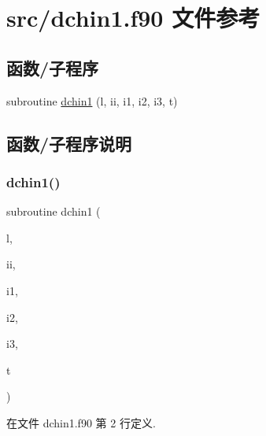 \hypertarget{dchin1_8f90}{}\section{src/dchin1.f90 文件参考}
\label{dchin1_8f90}
\subsection*{函数/子程序}
\begin{DoxyCompactItemize}
\item 
subroutine \mbox{\hyperlink{dchin1_8f90_a32ea10453544eb3503437afd89f14439}{dchin1}} (l, ii, i1, i2, i3, t)
\end{DoxyCompactItemize}


\subsection{函数/子程序说明}
\mbox{\label{dchin1_8f90_a32ea10453544eb3503437afd89f14439}} 
\subsubsection{\texorpdfstring{dchin1()}{dchin1()}}
{\footnotesize\ttfamily subroutine dchin1 (\begin{DoxyParamCaption}\item[{}]{l,  }\item[{}]{ii,  }\item[{}]{i1,  }\item[{}]{i2,  }\item[{}]{i3,  }\item[{}]{t }\end{DoxyParamCaption})}



在文件 dchin1.\+f90 第 2 行定义.

